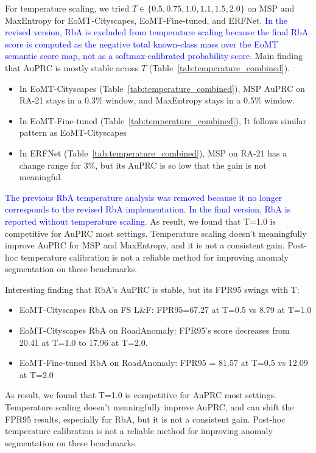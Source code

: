 For temperature scaling, we tried $T \in \{0.5, 0.75, 1.0, 1.1, 1.5, 2.0\}$ on MSP and MaxEntropy 
for EoMT-Cityscapes, EoMT-Fine-tuned, and ERFNet.
\textcolor{blue}{In the revised version, RbA is excluded from temperature scaling because the final RbA score is computed as the negative total known-class mass over the EoMT semantic score map, not as a softmax-calibrated probability score.}
Main finding that AuPRC is mostly stable across $T$ (Table~\ref{tab:temperature_combined}).
\begin{itemize}
    \item In EoMT-Cityscapes (Table~\ref{tab:temperature_combined}), MSP AuPRC on RA-21 stays in a 0.3\% window, and MaxEntropy stays in a 0.5\% window.
    \item In EoMT-Fine-tuned (Table~\ref{tab:temperature_combined}), It follows similar pattern as EoMT-Cityscapes
    \item In ERFNet (Table~\ref{tab:temperature_combined}), MSP on RA-21 has a change range for 3\%, but its AuPRC is so low that the gain is not meaningful. 
\end{itemize}

\textcolor{blue}{The previous RbA temperature analysis was removed because it no longer corresponds to the revised RbA implementation. In the final version, RbA is reported without temperature scaling.}
As result, we found that T=1.0 is competitive for AuPRC most settings. Temperature scaling doesn't meaningfully improve AuPRC for MSP and MaxEntropy, and it is not a consistent gain.
Post-hoc temperature calibration is not a reliable method for improving anomaly segmentation on these benchmarks.



Interesting finding that RbA's AuPRC is stable, but its FPR95 swings with T:
\begin{itemize}
    \item EoMT-Cityscapes RbA on FS L\&F: FPR95=67.27 at T=0.5 vs 8.79 at T=1.0
    \item EoMT-Cityscapes RbA on RoadAnomaly: FPR95's score decreases from 20.41 at T=1.0 to 17.96 at T=2.0.
    \item EoMT-Fine-tuned RbA on RoadAnomaly: FPR95 = 81.57 at T=0.5 vs 12.09 at T=2.0
\end{itemize}

As result, we found that T=1.0 is competitive for AuPRC most settings. Temperature scaling doesn't meaningfully improve AuPRC, and can shift the FPR95 results, especially for RbA, but it is not a consistent gain.
Post-hoc temperature calibration is not a reliable method for improving anomaly segmentation on these benchmarks.
